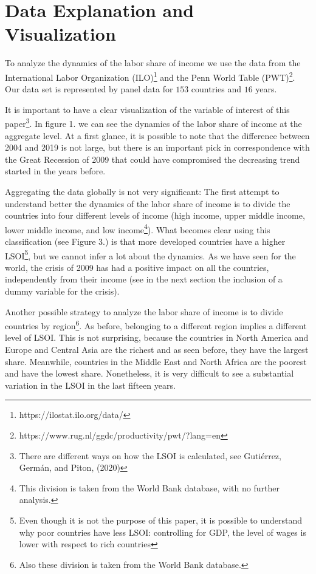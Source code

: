 \documentclass[12pt, letterpaper]{article}
\numberwithin{table}{section}   %
\begin{document}


\section{Data Explanation and Visualization}\label{sec_4}

To analyze the dynamics of the labor share of income we use the data from the International Labor Organization (ILO)\footnote{https://ilostat.ilo.org/data/} and the Penn World Table (PWT)\footnote{https://www.rug.nl/ggdc/productivity/pwt/?lang=en}. Our data set is represented by panel data for $153$ countries and $16$ years.

It is important to have a clear visualization of the variable of interest of this paper\footnote{There are different ways on how the LSOI is calculated, see Gutiérrez, Germán, and Piton, (2020)}.
In figure 1. we can see the dynamics of the labor share of income at the aggregate level. At a first glance, it is possible to note that the difference between 2004 and 2019 is not large, but there is an important pick in correspondence with the Great Recession of 2009 that could have compromised the decreasing trend started in the years before.

Aggregating the data globally is not very significant:
The first attempt to understand better the dynamics of the labor share of income is to divide the countries into four different levels of income (high income, upper middle income, lower middle income, and low income\footnote{This division is taken from the World Bank database, with no further analysis.}). What becomes clear using this classification (see Figure 3.) is that more developed countries have a higher LSOI\footnote{Even though it is not the purpose of this paper, it is possible to understand why poor countries have less LSOI: controlling for GDP, the level of wages is lower with respect to rich countries}, but we cannot infer a lot about the dynamics. As we have seen for the world, the crisis of 2009 has had a positive impact on all the countries, independently from their income (see in the next section the inclusion of a dummy variable for the crisis).

Another possible strategy to analyze the labor share of income is to divide countries by region\footnote{Also these division is taken from the World Bank database.}. As before, belonging to a different region  implies a different level of LSOI. This is not surprising, because the countries in North America and Europe and Central Asia are the richest and as seen before, they have the largest share. Meanwhile, countries in the Middle East and North Africa are the poorest and have the lowest share. Nonetheless, it is very difficult to see a substantial variation in the LSOI in the last fifteen years.  
\end{document}
